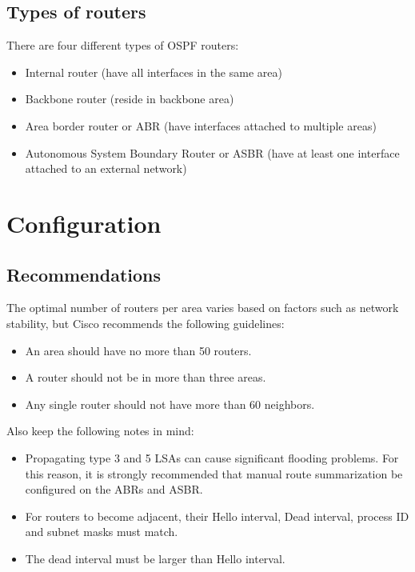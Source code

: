 \subsection{Types of routers}

There are four different types of OSPF routers:

\begin{itemize}
\item Internal router (have all interfaces in the same area)
\item Backbone router (reside in backbone area)
\item Area border router or ABR (have interfaces attached to multiple areas)
\item Autonomous System Boundary Router or ASBR (have at least one interface attached to an external network)
\end{itemize}

\section{Configuration}

\subsection{Recommendations}

The optimal number of routers per area varies based on factors such as network stability, but Cisco recommends the following guidelines:
\begin{itemize}
\item An area should have no more than 50 routers.
\item A router should not be in more than three areas.
\item Any single router should not have more than 60 neighbors.
\end{itemize}

Also keep the following notes in mind:
\begin{itemize}
\item Propagating type 3 and 5 LSAs can cause significant flooding problems. For this reason, it is strongly recommended that manual route summarization be configured on the ABRs and ASBR.
\item For routers to become adjacent, their Hello interval, Dead interval, process ID and subnet masks must match.
\item  The dead interval must be larger than Hello interval.
\end{itemize}

